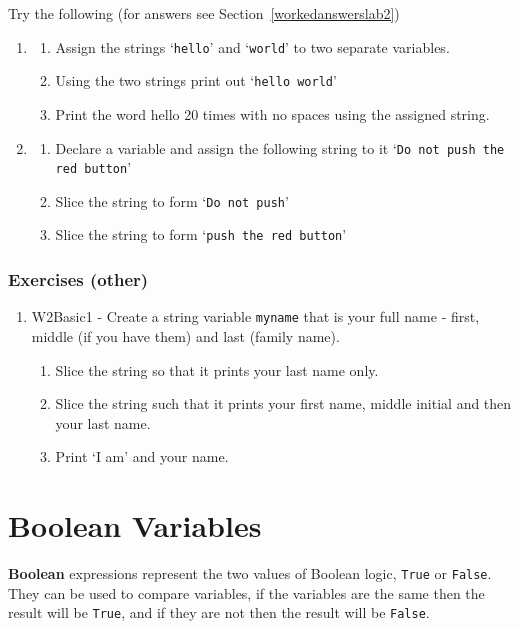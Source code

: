 Try the following (for answers see Section~\ref{workedanswerslab2})
\begin{enumerate}
\item
\begin{enumerate}
\item Assign the strings `\texttt{hello}' and `\texttt{world}' to two separate variables.
\item Using the two strings print out `\texttt{hello world}'
\item Print the word hello 20 times with no spaces using the assigned string.
\end{enumerate}
\item
\begin{enumerate}
\item Declare a variable and assign the following string to it `\texttt{Do not push the red button}'
\item Slice the string to form `\texttt{Do not push}'
\item Slice the string to form `\texttt{push the red button}'
\end{enumerate}
\end{enumerate}

\subsubsection{Exercises (other)}

\begin{enumerate}
\item W2Basic1 - Create a string variable \texttt{myname} that is your full name - first, middle (if you have them) and last (family name).
\begin{enumerate}
      \item Slice the string so that it prints your last name only.
      \item Slice the string such that it prints your first name, middle initial and then your last name.
      \item Print `I am' and your name.
\end{enumerate}
\end{enumerate}

\section{Boolean Variables}
\label{boolvars}

\textbf{Boolean} expressions represent the two values of Boolean logic, \texttt{True} or \texttt{False}. They can be used to compare variables, if the variables are the same then the result will be \texttt{True}, and if they are not then the result will be \texttt{False}.

